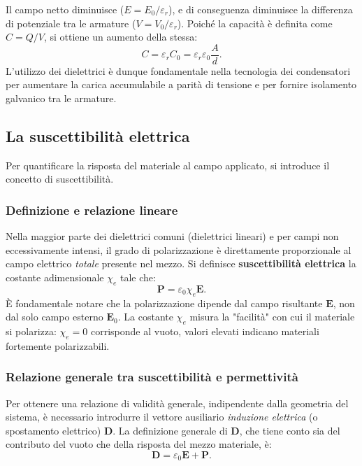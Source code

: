 \documentclass[a4paper,11pt]{report}
\begin{document}
Il campo netto diminuisce ($E = E_0 / \varepsilon_r$), e di conseguenza diminuisce la differenza di potenziale tra le armature ($V = V_0 / \varepsilon_r$). Poiché la capacità è definita come $C = Q/V$, si ottiene un aumento della stessa:
\begin{equation}
    C = \varepsilon_r C_0 = \varepsilon_r \varepsilon_0 \frac{A}{d}.
\end{equation}
L'utilizzo dei dielettrici è dunque fondamentale nella tecnologia dei condensatori per aumentare la carica accumulabile a parità di tensione e per fornire isolamento galvanico tra le armature.

\subsection{La suscettibilità elettrica}
Per quantificare la risposta del materiale al campo applicato, si introduce il concetto di suscettibilità.

\subsubsection{Definizione e relazione lineare}
Nella maggior parte dei dielettrici comuni (dielettrici lineari) e per campi non eccessivamente intensi, il grado di polarizzazione è direttamente proporzionale al campo elettrico \textit{totale} presente nel mezzo.
Si definisce \textbf{suscettibilità elettrica} la costante adimensionale $\chi_e$ tale che:
\begin{equation}
    \bm{P} = \varepsilon_0 \chi_e \bm{E}.
    \label{eq:suscettibilita}
\end{equation}
È fondamentale notare che la polarizzazione dipende dal campo risultante $\bm{E}$, non dal solo campo esterno $\bm{E}_0$.
La costante $\chi_e$ misura la "facilità" con cui il materiale si polarizza: $\chi_e=0$ corrisponde al vuoto, valori elevati indicano materiali fortemente polarizzabili.

\subsubsection{Relazione generale tra suscettibilità e permettività}
Per ottenere una relazione di validità generale, indipendente dalla geometria del sistema, è necessario introdurre il vettore ausiliario \textit{induzione elettrica} (o spostamento elettrico) $\bm{D}$.
La definizione generale di $\bm{D}$, che tiene conto sia del contributo del vuoto che della risposta del mezzo materiale, è:
\begin{equation}
    \bm{D} = \varepsilon_0 \bm{E} + \bm{P}.
    \label{eq:definizione_D}
\end{equation}
\end{document}
